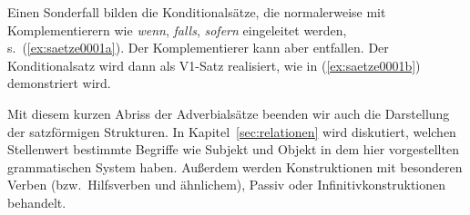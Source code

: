 

Einen Sonderfall bilden die Konditionalsätze, die normalerweise mit Komplementierern wie \textit{wenn}, \textit{falls}, \textit{sofern} eingeleitet werden, s.\ (\ref{ex:saetze0001a}).
Der Komplementierer kann aber entfallen.
Der Konditionalsatz wird dann als V1-Satz realisiert, wie in (\ref{ex:saetze0001b}) demonstriert wird.

\begin{exe}
  \ex\label{ex:saetze0001}
  \begin{xlist}
  \end{xlist}
\end{exe}

Mit diesem kurzen Abriss der Adverbialsätze beenden wir auch die Darstellung der satzförmigen Strukturen.
In Kapitel~\ref{sec:relationen} wird diskutiert, welchen Stellenwert bestimmte Begriffe wie Subjekt und Objekt in dem hier vorgestellten grammatischen System haben.
Außerdem werden Konstruktionen mit besonderen Verben (bzw.\ Hilfsverben und ähnlichem), \zB Passiv oder Infinitivkonstruktionen behandelt.

\Zusammenfassung

